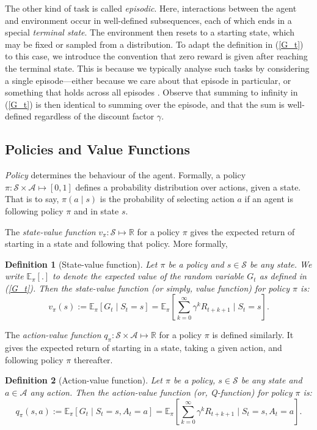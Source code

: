 \documentclass[11pt, a4paper, bibliography=totoc]{report}
\newcommand{\reals}{\mathbb{R}}
\newcommand{\E}[2]{\mathbb{E}_{#1} \left[ #2 \right] }
\newtheorem{definition}{Definition}
\begin{document}
The other kind of task is called \textit{episodic}. Here, interactions between the agent and environment occur in well-defined subsequences, each of which ends in a special \textit{terminal state}. The environment then resets to a starting state, which may be fixed or sampled from a distribution. To adapt the definition in (\ref{G_t}) to this case, we introduce the convention that zero reward is given after reaching the terminal state. This is because we typically analyse such tasks by considering a single episode---either because we care about that episode in particular, or something that holds across all episodes \cite[p.~57]{Sutton2018}. Observe that summing to infinity in (\ref{G_t}) is then identical to summing over the episode, and that the sum is well-defined regardless of the discount factor $ \gamma $.

\subsection{Policies and Value Functions} \label{policy_value_functions}
\textit{Policy} determines the behaviour of the agent. Formally, a policy $ \pi : \mathcal{S} \times \mathcal{A} \mapsto [0,1] $ defines a probability distribution over actions, given a state. That is to say, $ \pi(a \mid s) $ is the probability of selecting action $ a $ if an agent is following policy $ \pi $ and in state $ s $.

The \textit{state-value function} $ v_\pi : \mathcal{S} \mapsto \reals $ for a policy $ \pi $ gives the expected return of starting in a state and following that policy. More formally,
\begin{definition}[State-value function]
	Let $ \pi $ be a policy and $ s \in \mathcal{S} $ be any state. We write $ \E{\pi}{.}$ to denote the expected value of the random variable $ G_t $ as defined in (\ref{G_t}). Then the state-value function (or simply, value function) for policy $ \pi $ is:
	\begin{equation} \label{v_pi}
	v_\pi(s) := \E{\pi}{G_t \mid S_t = s} = \E{\pi}{\sum_{k=0}^{\infty} \gamma^k R_{t+k+1} \mid S_t = s}.
	\end{equation}
\end{definition}

The \textit{action-value function} $ q_\pi : \mathcal{S} \times \mathcal{A} \mapsto \reals $ for a policy $ \pi $ is defined similarly. It gives the expected return of starting in a state, taking a given action, and following policy $ \pi $ thereafter.
\begin{definition}[Action-value function]
	Let $ \pi $ be a policy, $ s \in \mathcal{S} $ be any state and $ a \in \mathcal{A} $ any action. Then the action-value function (or, Q-function) for policy $ \pi $ is:
	\begin{equation} \label{q_pi}
	q_\pi(s, a) := \E{\pi}{G_t \mid S_t = s, A_t = a} = \E{\pi}{\sum_{k=0}^{\infty} \gamma^k R_{t+k+1} \mid S_t = s, A_t = a}.
	\end{equation}
\end{definition}
\end{document}
